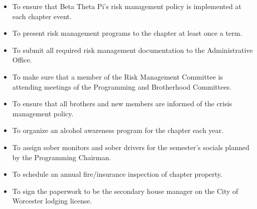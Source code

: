 \begin{itemize}

\item To ensure that Beta Theta Pi’s risk management policy is implemented at
each chapter event. 
\item To present risk management programs to the chapter at least once a term.
\item To submit all required risk management documentation to the
Administrative Office.
\item To make sure that a member of the Risk Management Committee is attending
meetings of the Programming and Brotherhood Committees.
\item To ensure that all brothers and new members are informed of the crisis
management policy.
\item To organize an alcohol awareness program for the chapter each year.
\item To assign sober monitors and sober drivers for the semester’s socials
planned by the Programming Chairman.
\item To schedule an annual fire/insurance inspection of chapter property.
\item To sign the paperwork to be the secondary house manager on the City of
Worcester lodging license.
\end{itemize}

